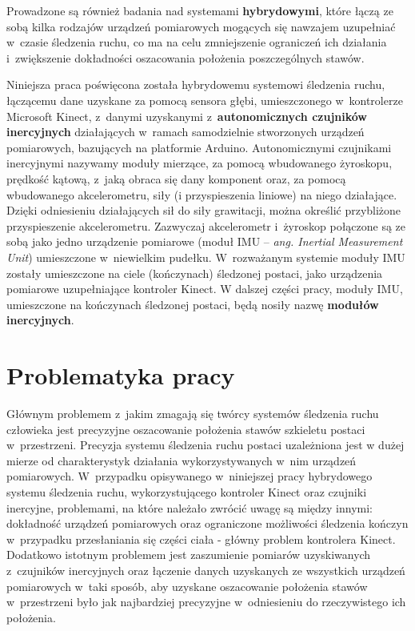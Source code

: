 Prowadzone są również badania nad systemami \textbf{hybrydowymi}, które łączą ze sobą kilka rodzajów urządzeń pomiarowych mogących się nawzajem uzupełniać w~czasie śledzenia ruchu, co ma na celu zmniejszenie ograniczeń ich działania i~zwiększenie dokładności oszacowania położenia poszczególnych stawów.

Niniejsza praca poświęcona została hybrydowemu systemowi śledzenia ruchu, łączącemu dane uzyskane za pomocą sensora głębi, umieszczonego w~kontrolerze Microsoft Kinect, z~danymi uzyskanymi z~\textbf{autonomicznych czujników inercyjnych} działających w~ramach samodzielnie stworzonych urządzeń pomiarowych, bazujących na platformie Arduino. Autonomicznymi czujnikami inercyjnymi nazywamy moduły mierzące, za pomocą wbudowanego żyroskopu, prędkość kątową, z~jaką obraca się dany komponent oraz, za pomocą wbudowanego akcelerometru, siły (i przyspieszenia liniowe) na niego działające. Dzięki odniesieniu działających sił do siły grawitacji, można określić przybliżone przyspieszenie akcelerometru. Zazwyczaj akcelerometr i~żyroskop połączone są ze sobą jako jedno urządzenie pomiarowe (moduł IMU -- \emph{ang. Inertial Measurement Unit}) umieszczone w~niewielkim pudełku. W~rozważanym systemie moduły IMU zostały umieszczone na ciele (kończynach) śledzonej postaci, jako urządzenia pomiarowe uzupełniające kontroler Kinect. W dalszej części pracy, moduły IMU, umieszczone na kończynach śledzonej postaci, będą nosiły nazwę \textbf{modułów inercyjnych}.

\section{Problematyka pracy}
Głównym problemem z~jakim zmagają się twórcy systemów śledzenia ruchu człowieka jest precyzyjne oszacowanie położenia stawów szkieletu postaci w~przestrzeni. Precyzja systemu śledzenia ruchu postaci uzależniona jest w dużej mierze od charakterystyk działania wykorzystywanych w~nim urządzeń pomiarowych. W~przypadku opisywanego w~niniejszej pracy hybrydowego systemu śledzenia ruchu, wykorzystującego kontroler Kinect oraz czujniki inercyjne, problemami, na które należało zwrócić uwagę są między innymi: dokładność urządzeń pomiarowych oraz ograniczone możliwości śledzenia kończyn w~przypadku przesłaniania się części ciała - główny problem kontrolera Kinect. Dodatkowo istotnym problemem jest zaszumienie pomiarów uzyskiwanych z~czujników inercyjnych oraz łączenie danych uzyskanych ze wszystkich urządzeń pomiarowych w~taki sposób, aby uzyskane oszacowanie położenia stawów w~przestrzeni było jak najbardziej precyzyjne w~odniesieniu do rzeczywistego ich położenia.

